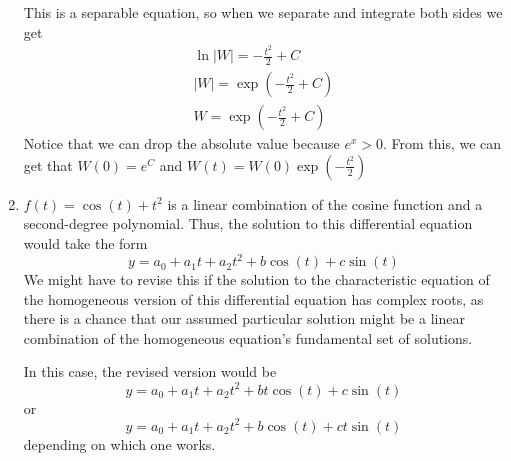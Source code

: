 \documentclass[12pt]{article}
\begin{document}
\begin{enumerate}
          This is a separable equation, so when we separate and integrate both sides we get
          \begin{gather*}
              \ln |W|=-\frac{t^2}{2}+C \\
              |W|=\exp\left(-\frac{t^2}{2}+C\right) \\
              W=\exp\left(-\frac{t^2}{2}+C\right)
          \end{gather*}
          Notice that we can drop the absolute value because $e^x>0$.
          From this, we can get that $W(0)=e^C$ and $\boxed{W(t)=W(0)\exp\left(-\frac{t^2}{2 }\right)}$
    \item $f(t)=\cos(t)+t^2$ is a linear combination of the cosine function and a second-degree polynomial.
          Thus, the solution to this differential equation would take the form
          \[y=a_0+a_1t+a_2t^2+b\cos(t)+c\sin(t)\]
          We might have to revise this if the solution to the characteristic equation of the homogeneous version of this differential equation
          has complex roots, as there is a chance that our assumed particular solution might be a linear combination of the homogeneous equation's
          fundamental set of solutions.

          In this case, the revised version would be
          \[y=a_0+a_1t+a_2t^2+bt\cos(t)+c\sin(t)\]
          or
          \[y=a_0+a_1t+a_2t^2+b\cos(t)+ct\sin(t)\]
          depending on which one works.
\end{enumerate}
\end{document}
